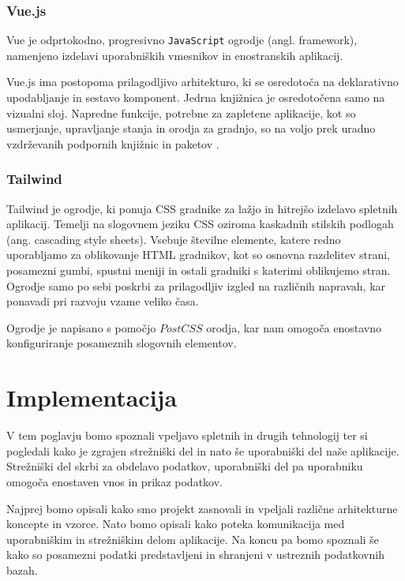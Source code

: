 \documentclass[a4paper, 12pt]{book}
\begin{document}
\subsection{Vue.js}
\label{vue-js-section}
Vue je odprtokodno, progresivno \verb=JavaScript= ogrodje (angl. framework), namenjeno izdelavi uporabniških vmesnikov in enostranskih aplikacij.

Vue.js ima postopoma prilagodljivo arhitekturo, ki se osredotoča na deklarativno upodabljanje in sestavo komponent. Jedrna knjižnica je osredotočena samo na vizualni sloj. Napredne funkcije, potrebne za zapletene aplikacije, kot so usmerjanje, upravljanje stanja in orodja za gradnjo, so na voljo prek uradno vzdrževanih podpornih knjižnic in paketov \cite{vue-js-what-is}.

 \subsection{Tailwind}
\label{tailwind-section}
Tailwind je ogrodje, ki ponuja CSS gradnike za lažjo in hitrejšo izdelavo spletnih aplikacij. Temelji na slogovnem jeziku CSS oziroma kaskadnih stilskih podlogah (ang. cascading style sheets). Vsebuje številne elemente, katere redno uporabljamo za oblikovanje HTML gradnikov, kot so osnovna razdelitev strani, posamezni gumbi, spustni meniji in ostali gradniki s katerimi oblikujemo stran. Ogrodje samo po sebi poskrbi za prilagodljiv izgled na različnih napravah, kar ponavadi pri razvoju vzame veliko časa. 

Ogrodje je napisano s pomočjo $PostCSS$ orodja, kar nam omogoča enostavno konfiguriranje posameznih slogovnih elementov. 

\chapter{Implementacija}
V tem poglavju bomo spoznali vpeljavo spletnih in drugih tehnologij ter si pogledali kako je zgrajen strežniški del in nato še uporabniški del naše aplikacije. Strežniški del skrbi za obdelavo podatkov, uporabniški del pa uporabniku omogoča enostaven vnos in prikaz podatkov.

Najprej bomo opisali kako smo projekt zasnovali in vpeljali različne arhitekturne koncepte in vzorce. Nato bomo opisali kako poteka komunikacija med uporabniškim in strežniškim delom aplikacije. Na koncu pa bomo spoznali še kako so posamezni podatki predstavljeni in shranjeni v ustreznih podatkovnih bazah. 
\end{document}
